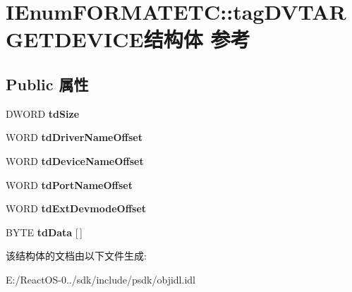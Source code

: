 \hypertarget{struct_i_enum_f_o_r_m_a_t_e_t_c_1_1tag_d_v_t_a_r_g_e_t_d_e_v_i_c_e}{}\section{I\+Enum\+F\+O\+R\+M\+A\+T\+E\+TC\+:\+:tag\+D\+V\+T\+A\+R\+G\+E\+T\+D\+E\+V\+I\+C\+E结构体 参考}
\label{struct_i_enum_f_o_r_m_a_t_e_t_c_1_1tag_d_v_t_a_r_g_e_t_d_e_v_i_c_e}
\subsection*{Public 属性}
\begin{DoxyCompactItemize}
\item 
\mbox{\label{struct_i_enum_f_o_r_m_a_t_e_t_c_1_1tag_d_v_t_a_r_g_e_t_d_e_v_i_c_e_a232744eb8a76b77dd5780ed74d2a8359}} 
D\+W\+O\+RD {\bfseries td\+Size}
\item 
\mbox{\label{struct_i_enum_f_o_r_m_a_t_e_t_c_1_1tag_d_v_t_a_r_g_e_t_d_e_v_i_c_e_a8f0dad10fe40333d116495819839e267}} 
W\+O\+RD {\bfseries td\+Driver\+Name\+Offset}
\item 
\mbox{\label{struct_i_enum_f_o_r_m_a_t_e_t_c_1_1tag_d_v_t_a_r_g_e_t_d_e_v_i_c_e_a08f0454881c4dae44ed93c3be3feacd3}} 
W\+O\+RD {\bfseries td\+Device\+Name\+Offset}
\item 
\mbox{\label{struct_i_enum_f_o_r_m_a_t_e_t_c_1_1tag_d_v_t_a_r_g_e_t_d_e_v_i_c_e_aa940a0563e51099f95c68aa524055193}} 
W\+O\+RD {\bfseries td\+Port\+Name\+Offset}
\item 
\mbox{\label{struct_i_enum_f_o_r_m_a_t_e_t_c_1_1tag_d_v_t_a_r_g_e_t_d_e_v_i_c_e_a8454e1e9fa3d81599bc74e3ca2b55bea}} 
W\+O\+RD {\bfseries td\+Ext\+Devmode\+Offset}
\item 
\mbox{\label{struct_i_enum_f_o_r_m_a_t_e_t_c_1_1tag_d_v_t_a_r_g_e_t_d_e_v_i_c_e_a23e455a131ed5f63890c151cc418bf7d}} 
B\+Y\+TE {\bfseries td\+Data} \mbox{[}$\,$\mbox{]}
\end{DoxyCompactItemize}


该结构体的文档由以下文件生成\+:\begin{DoxyCompactItemize}
\item 
E\+:/\+React\+O\+S-\/0../sdk/include/psdk/objidl.\+idl\end{DoxyCompactItemize}
